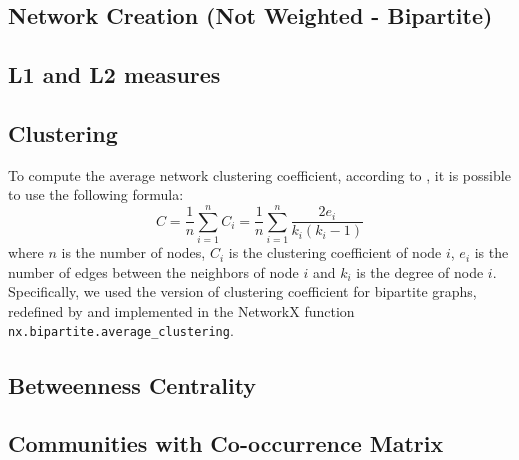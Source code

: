 
\subsection{Network Creation (Not Weighted - Bipartite)}

\subsection{L1 and L2 measures}

\subsection{Clustering}
To compute the average network clustering coefficient, according to \cite{Watts_Strogatz_1998}, it is possible to use the following
formula: 
\begin{equation}
    C = \frac{1}{n}\sum_{i = 1}^{n} C_i = \frac{1}{n}\sum_{i = 1}^{n} \frac{2e_i}{k_i(k_i-1)}
\end{equation}
where $n$ is the number of nodes, $C_i$ is the clustering coefficient of node $i$, $e_i$ is the number of edges between the neighbors of node $i$ and $k_i$ is the degree of node $i$.
Specifically, we used the version of clustering coefficient for bipartite graphs, redefined by \cite{Latapy_Magnien_Vecchio_2008} and implemented
in the NetworkX function \texttt{nx.bipartite.average\_clustering}.


\subsection{Betweenness Centrality}

\subsection{Communities with Co-occurrence Matrix}



